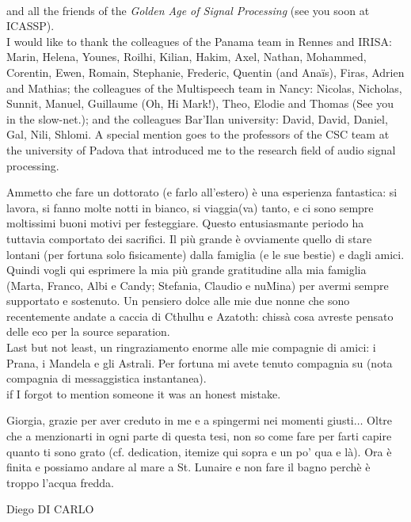 \\and all the friends of the \textit{Golden Age of Signal Processing} (see you soon at ICASSP).
\\I would like to thank the colleagues of the Panama team in Rennes and IRISA: Marin, Helena, Younes, Roilhi, Kilian, Hakim, Axel, Nathan, Mohammed, Corentin, Ewen, Romain, Stephanie, Frederic, Quentin (and Ana\"is), Firas, Adrien and Mathias;
the colleagues of the Multispeech team in Nancy: Nicolas, Nicholas, Sunnit, Manuel, Guillaume (Oh, Hi Mark!), Theo, Elodie and Thomas (See you in the slow-net.);
and the colleagues Bar'Ilan university: David, David, Daniel, Gal, Nili, Shlomi.
A special mention goes to the professors of the CSC team at the university of Padova that introduced me to the research field of audio signal processing.

\mynewline
Ammetto che fare un dottorato (e farlo all'estero) \`e una esperienza fantastica:
si lavora,
si fanno molte notti in bianco, si viaggia(va) tanto, e ci sono sempre moltissimi buoni motivi per festeggiare.
Questo entusiasmante periodo ha tuttavia comportato dei sacrifici.
Il pi\`u grande \`e ovviamente quello di stare lontani (per fortuna solo fisicamente) dalla famiglia (e le sue bestie) e dagli amici.
Quindi vogli qui esprimere la mia pi\`u grande gratitudine alla mia famiglia (Marta, Franco, Albi e Candy; Stefania, Claudio e nuMina) per avermi sempre supportato e sostenuto.
Un pensiero dolce alle mie due nonne che sono recentemente andate a caccia di Cthulhu e Azatoth: chiss\`a cosa avreste pensato delle eco per la source separation.
\\Last but not least, un ringraziamento enorme alle mie compagnie di amici: i Prana, i Mandela e gli Astrali.
Per fortuna mi avete tenuto compagnia su (nota compagnia di messaggistica instantanea).
\\if I forgot to mention someone it was an honest mistake.

\mynewline
Giorgia, grazie per aver creduto in me e a spingermi nei momenti giusti$\ldots$
Oltre che a menzionarti in ogni parte di questa tesi, non so come fare per farti capire quanto ti sono grato (cf. dedication, itemize qui sopra e un po' qua e l\`a).
Ora \`e finita e possiamo andare al mare a St. Lunaire e non fare il bagno perch\`e \`e troppo l'acqua fredda.

\begin{flushright}
    Diego DI CARLO
\end{flushright}
